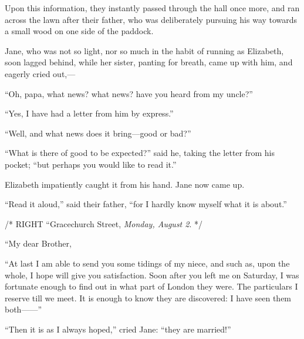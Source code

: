 Upon this information, they instantly passed through the hall once more, and ran across the lawn after their father, who was deliberately pursuing his way towards a small wood on one side of the paddock.

Jane, who was not so light, nor so much in the habit of running as Elizabeth, soon lagged behind, while her sister, panting for breath, came up with him, and eagerly cried out,---

``Oh, papa, what news? what news? have you heard from my uncle?''

``Yes, I have had a letter from him by express.''

``Well, and what news does it bring---good or bad?''

``What is there of good to be expected?'' said he, taking the letter from his pocket; ``but perhaps you would like to read it.''

Elizabeth impatiently caught it from his hand. Jane now came up.

``Read it aloud,'' said their father, ``for I hardly know myself what it is about.''

/* RIGHT ``Gracechurch Street, \textit{Monday, August 2}. */

``My dear Brother,

``At last I am able to send you some tidings of my niece, and such as, upon the whole, I hope will give you satisfaction. Soon after you left me on Saturday, I was fortunate enough to find out in what part of London they were. The particulars I reserve till we meet. It is enough to know they are discovered: I have seen them both------''



``Then it is as I always hoped,'' cried Jane: ``they are married!''

